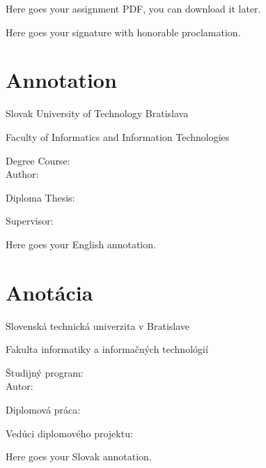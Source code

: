 \newpage
\thispagestyle{empty}
Here goes your assignment PDF, you can download it later.
%
\newpage

\newpage{}\thispagestyle{empty}

\newpage
\thispagestyle{empty}
\mbox{}
\newpage

\newpage
\thispagestyle{empty}
Here goes your signature with honorable proclamation.
%
\newpage

\newpage{}\thispagestyle{empty}

\newpage
\thispagestyle{empty}
\mbox{}
\newpage

\thispagestyle{empty}
\section*{Annotation}

\begin{minipage}[t]{1\columnwidth}%
Slovak University of Technology Bratislava 

Faculty of Informatics and Information Technologies

Degree Course: \myStudyProgram\\

Author: \myName

Diploma Thesis: \myTitle

Supervisor: \mySupervisor

\myDate%
\end{minipage}

\bigskip{}
\noindent
Here goes your English annotation.


\newpage{}\thispagestyle{empty}

\newpage
\thispagestyle{empty}
\mbox{}
\newpage

\thispagestyle{empty}
\section*{Anotácia}

\begin{minipage}[t]{1\columnwidth}%
Slovenská technická univerzita v Bratislave

Fakulta informatiky a informačných technológií

Študijný program: \myStudyProgramSK\\

Autor: \myName

Diplomová práca: \myTitleSK

Vedúci diplomového projektu: \mySupervisor

\myDateSK
\end{minipage}

\bigskip{}
\noindent
Here goes your Slovak annotation.


\newpage{}\thispagestyle{empty}\medskip{}


\newpage{}



\thispagestyle{empty}
\mbox{}
\newpage

